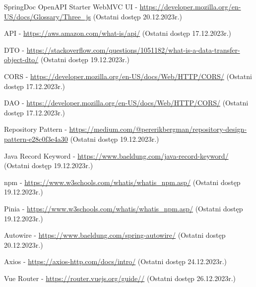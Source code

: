 \documentclass[11pt,a4paper]{article}
\begin{document}
\begin{thebibliography}{9}
SpringDoc OpenAPI Starter WebMVC UI - \url{https://developer.mozilla.org/en-US/docs/Glossary/Three_js} (Ostatni dostęp 20.12.2023r.)

API - \url{https://aws.amazon.com/what-is/api/} (Ostatni dostęp 17.12.2023r.)

DTO - \url{https://stackoverflow.com/questions/1051182/what-is-a-data-transfer-object-dto/} (Ostatni dostęp 19.12.2023r.)

CORS - \url{https://developer.mozilla.org/en-US/docs/Web/HTTP/CORS/} (Ostatni dostęp 17.12.2023r.)

DAO - \url{https://developer.mozilla.org/en-US/docs/Web/HTTP/CORS/} (Ostatni dostęp 17.12.2023r.)

Repository Pattern - \url{https://medium.com/@pererikbergman/repository-design-pattern-e28c0f3e4a30} (Ostatni dostęp 19.12.2023r.)

Java Record Keyword - \url{https://www.baeldung.com/java-record-keyword/} (Ostatni dostęp 19.12.2023r.)

npm - \url{https://www.w3schools.com/whatis/whatis_npm.asp/} (Ostatni dostęp 19.12.2023r.)

Pinia - \url{https://www.w3schools.com/whatis/whatis_npm.asp/} (Ostatni dostęp 19.12.2023r.)

Autowire - \url{https://www.baeldung.com/spring-autowire/} (Ostatni dostęp 20.12.2023r.)

Axios - \url{https://axios-http.com/docs/intro/} (Ostatni dostęp 24.12.2023r.)

Vue Router - \url{https://router.vuejs.org/guide//} (Ostatni dostęp 26.12.2023r.)



\end{thebibliography}


\end{document}
